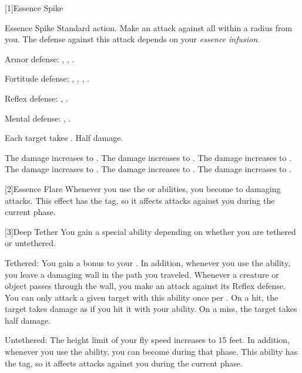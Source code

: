     [1]{Essence Spike}
      \begin{magicalactiveability}{Essence Spike}
        \abilityusagetime Standard action.
        \rankline
        Make an attack against all  within a \smallarea radius from you.
        The defense against this attack depends on your \textit{essence infusion}.
        \begin{raggeditemize}
          \item Armor defense: \atAir, \atEarth, \atWater.
          \item Fortitude defense: \atAcid, \atAuditory, \atCold, \atElectricity.
          \item Reflex defense: \atFire, \atVisual.
          \item Mental defense: \atCompulsion, \atEmotion.
        \end{raggeditemize}
        \hit Each target takes \damagerankone{}.
        \miss Half damage.

        \rankline
         The damage increases to \damageranktwo{}.
         The damage increases to \damagerankthree{}.
         The damage increases to \damagerankfour{}.
         The damage increases to \damagerankfive{}.
         The damage increases to \damageranksix{}.
         The damage increases to \damagerankseven{}.
      \end{magicalactiveability}

    [2]{Essence Flare} Whenever you use the  or  abilities, you  become \impervious to damaging attacks.
      This effect has the  tag, so it affects attacks against you during the current phase.

    [3]{Deep Tether} You gain a special ability depending on whether you are tethered or untethered.
      \begin{raggeditemize}
        \item Tethered: You gain a  bonus to your .
          In addition, whenever you use the  ability, you leave a damaging wall in the path you traveled.
          Whenever a creature or object passes through the wall, you make an attack against its Reflex defense.
          You can only attack a given target with this ability once per .
          On a hit, the target takes damage as if you hit it with your  ability.
          On a miss, the target takes half damage.
        \item Untethered: The height limit of your fly speed increases to 15 feet.
          In addition, whenever you use the  ability, you can become  during that phase.
          This ability has the  tag, so it affects attacks against you during the current phase.
      \end{raggeditemize}

